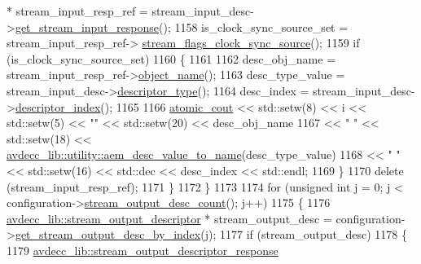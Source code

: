 \begin{DoxyCode}
       * stream\_input\_resp\_ref = stream\_input\_desc->\hyperlink{classavdecc__lib_1_1stream__input__descriptor_a1be36084f46cee6b34b31b75e7667cc6}{get\_stream\_input\_response}();
1158                     is\_clock\_sync\_source\_set = stream\_input\_resp\_ref->
      \hyperlink{classavdecc__lib_1_1stream__input__descriptor__response_a995e03199cdf8ff67b735e202ee731c9}{stream\_flags\_clock\_sync\_source}();
1159                     \textcolor{keywordflow}{if} (is\_clock\_sync\_source\_set)
1160                     \{
1161 
1162                         desc\_obj\_name = stream\_input\_resp\_ref->\hyperlink{classavdecc__lib_1_1descriptor__response__base_a133f7774946d80f82b8aaaa4cfbb7361}{object\_name}();
1163                         desc\_type\_value = stream\_input\_desc->\hyperlink{classavdecc__lib_1_1descriptor__base_a5112b70022171063ec5d3242bee9910e}{descriptor\_type}();
1164                         desc\_index = stream\_input\_desc->\hyperlink{classavdecc__lib_1_1descriptor__base_a7eed5583bffdf72d89021b188648c1b5}{descriptor\_index}();
1165 
1166                         \hyperlink{cmd__line_8h_a0bc38ccc65c79ba06c6fcd7b4bf554c3}{atomic\_cout} << std::setw(8) << i << std::setw(5) << \textcolor{stringliteral}{""} << std::setw(20) 
      << desc\_obj\_name
1167                                     << \textcolor{stringliteral}{"  "} << std::setw(18) << 
      \hyperlink{namespaceavdecc__lib_1_1utility_a6bdd02679e5a911a071d4aa03be341f0}{avdecc\_lib::utility::aem\_desc\_value\_to\_name}(desc\_type\_value)
1168                                     << \textcolor{stringliteral}{"  "} << std::setw(16) << std::dec << desc\_index << std::endl;
1169                     \}
1170                     \textcolor{keyword}{delete} (stream\_input\_resp\_ref);
1171                 \}
1172             \}
1173 
1174             \textcolor{keywordflow}{for} (\textcolor{keywordtype}{unsigned} \textcolor{keywordtype}{int} j = 0; j < configuration->\hyperlink{classavdecc__lib_1_1configuration__descriptor_a9ebee6c612e3cfec50f5168790bd265c}{stream\_output\_desc\_count}();
       j++)
1175             \{
1176                 \hyperlink{classavdecc__lib_1_1stream__output__descriptor}{avdecc\_lib::stream\_output\_descriptor} * 
      stream\_output\_desc = configuration->\hyperlink{classavdecc__lib_1_1configuration__descriptor_a300ea5957342e2e9579318135da02856}{get\_stream\_output\_desc\_by\_index}(j);
1177                 \textcolor{keywordflow}{if} (stream\_output\_desc)
1178                 \{
1179                     \hyperlink{classavdecc__lib_1_1stream__output__descriptor__response}{avdecc\_lib::stream\_output\_descriptor\_response}

\end{DoxyCode}

